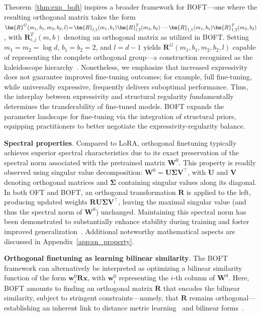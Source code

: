 Theorem~\ref{thm:exp_boft} inspires a broader framework for BOFT—one where the resulting orthogonal matrix takes the form $\thickmuskip=2mu \medmuskip=2mu \bm{R}^G(m_1,b_1,m_2,b_2,l)=\bm{R}_{l,1}(m_1,b_1)\bm{R}_{l,2}^T(m_2,b_2)\cdots\bm{R}_{1,1}(m_1,b_1)\bm{R}_{1,2}^T(m_2,b_2)$, with $\bm{R}_{i,j}^T(m,b)$ denoting an orthogonal matrix as utilized in BOFT. Setting $m_1=m_2=\log d$, $b_1=b_2=2$, and $l=d-1$ yields $\bm{R}^G(m_1,b_1,m_2,b_2,l)$ capable of representing the complete orthogonal group—a construction recognized as the kaleidoscope hierarchy~\cite{dao2019kaleidoscope}. Nonetheless, we emphasize that increased expressivity does not guarantee improved fine-tuning outcomes; for example, full fine-tuning, while universally expressive, frequently delivers suboptimal performance. Thus, the interplay between expressivity and structural regularity fundamentally determines the transferability of fine-tuned models. BOFT expands the parameter landscape for fine-tuning via the integration of structural priors, equipping practitioners to better negotiate the expressivity-regularity balance.

\textbf{Spectral properties}. Compared to LoRA, orthogonal finetuning typically achieves superior spectral characteristics due to its exact preservation of the spectral norm associated with the pretrained matrix $\bm{W}^0$. This property is readily observed using singular value decomposition: $\bm{W}^0 = \bm{U}\bm{\Sigma}\bm{V}^\top$, with $\bm{U}$ and $\bm{V}$ denoting orthogonal matrices and $\bm{\Sigma}$ containing singular values along its diagonal. In both OFT and BOFT, an orthogonal transformation $\bm{R}$ is applied to the left, producing updated weights $\bm{R}\bm{U}\bm{\Sigma}\bm{V}^\top$, leaving the maximal singular value (and thus the spectral norm of $\bm{W}^0$) unchanged. Maintaining this spectral norm has been demonstrated to substantially enhance stability during training and foster improved generalization~\cite{miyato2018spectral,yoshida2017spectral}. Additional noteworthy mathematical aspects are discussed in Appendix~\ref{app:sn_property}.

\textbf{Orthogonal finetuning as learning bilinear similarity}. The BOFT framework can alternatively be interpreted as optimizing a bilinear similarity function of the form $\bm{w}^0_i\bm{R}\bm{x}$, with $\bm{w}^0_i$ representing the $i$-th column of $\bm{W}^0$. Here, BOFT amounts to finding an orthogonal matrix $\bm{R}$ that encodes the bilinear similarity, subject to stringent constraints—namely, that $\bm{R}$ remains orthogonal—establishing an inherent link to distance metric learning~\cite{xing2002distance} and bilinear forms~\cite{roman2005advanced}.

